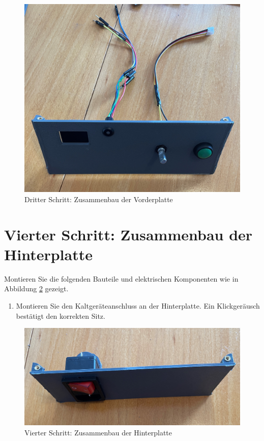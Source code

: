 \begin{figure}[H]
	\begin{center}
		\includegraphics[width=\textwidth]{Images/3Schr.jpg}
		\caption{Dritter Schritt: Zusammenbau der Vorderplatte} \label{3.S}
	\end{center}
\end{figure}


\section{Vierter Schritt: Zusammenbau der Hinterplatte}

Montieren Sie die folgenden Bauteile und elektrischen Komponenten wie in Abbildung \ref{4.S} gezeigt. 

\begin{enumerate}
	\item Montieren Sie den Kaltgeräteanschluss an der Hinterplatte. Ein Klickgeräusch bestätigt den korrekten Sitz.
\end{enumerate}

\begin{figure}[H]
	\begin{center}
		\includegraphics[width=\textwidth]{Images/4Schr.jpg}
		\caption{Vierter Schritt: Zusammenbau der Hinterplatte} \label{4.S}
	\end{center}
\end{figure}


